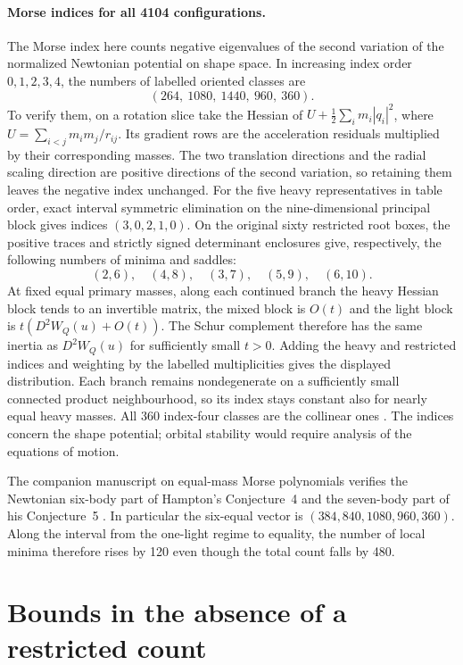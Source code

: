 \documentclass[11pt]{article}
\begin{document}
\paragraph{Morse indices for all 4104 configurations.}
The Morse index here counts negative eigenvalues of the second variation of the normalized Newtonian potential on shape space. In increasing index order $0,1,2,3,4$, the numbers of labelled oriented classes are
\[
 (264,\ 1080,\ 1440,\ 960,\ 360).
\]
To verify them, on a rotation slice take the Hessian of
$U+\frac12\sum_i m_i|q_i|^2$, where $U=\sum_{i<j}m_im_j/r_{ij}$. Its gradient rows are the acceleration residuals multiplied by their corresponding masses. The two translation directions and the radial scaling direction are positive directions of the second variation, so retaining them leaves the negative index unchanged. For the five heavy representatives in table order, exact interval symmetric elimination on the nine-dimensional principal block gives indices $(3,0,2,1,0)$. On the original sixty restricted root boxes, the positive traces and strictly signed determinant enclosures give, respectively, the following numbers of minima and saddles:
\[
 (2,6),\quad(4,8),\quad(3,7),\quad(5,9),\quad(6,10).
\]
At fixed equal primary masses, along each continued branch the heavy Hessian block tends to an invertible matrix, the mixed block is $O(t)$ and the light block is $t(D^2 W_Q(u)+O(t))$. The Schur complement therefore has the same inertia as $D^2 W_Q(u)$ for sufficiently small $t>0$. Adding the heavy and restricted indices and weighting by the labelled multiplicities gives the displayed distribution. Each branch remains nondegenerate on a sufficiently small connected product neighbourhood, so its index stays constant also for nearly equal heavy masses. All 360 index-four classes are the collinear ones \cite{collinear}. The indices concern the shape potential; orbital stability would require analysis of the equations of motion.

The companion manuscript on equal-mass Morse polynomials verifies the Newtonian six-body part of Hampton's Conjecture~4 and the seven-body part of his Conjecture~5 \cite{hamptonmorse}. In particular the six-equal vector is $(384,840,1080,960,360)$. Along the interval from the one-light regime to equality, the number of local minima therefore rises by 120 even though the total count falls by 480.

\section{Bounds in the absence of a restricted count}
\end{document}
